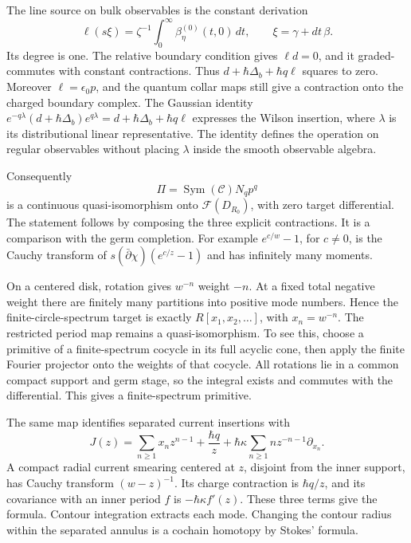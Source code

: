 The line source on bulk observables is the constant derivation
\[
 \ell(s\xi)=\zeta^{-1}\int_0^\infty\beta_\eta^{(0)}(t,0)\,dt,
 \qquad \xi=\gamma+dt\,\beta.
\]
Its degree is one. The relative boundary condition gives \(\ell d=0\),
and it graded-commutes with constant contractions. Thus
\(d+\hbar\Delta_b+\hbar q\ell\) squares to zero.
Moreover \(\ell=\epsilon_0p\), and the quantum collar maps still give a
contraction onto the charged boundary complex. The Gaussian identity
\(e^{-q\lambda}(d+\hbar\Delta_b)e^{q\lambda}
=d+\hbar\Delta_b+\hbar q\ell\) expresses the Wilson insertion, where
\(\lambda\) is its distributional linear representative. The identity
defines the operation on regular observables without placing \(\lambda\)
inside the smooth observable algebra.

Consequently
\begin{equation}\label{eq:vol2-native-smooth-period}
             \Pi=\operatorname{Sym}(\mathcal C)N_qp^q
\end{equation}
is a continuous quasi-isomorphism onto \(\mathscr F(D_{R_0})\), with zero
target differential. The statement follows by composing the three
explicit contractions. It is a comparison with the germ completion.
For example \(e^{c/w}-1\), for \(c\ne0\), is the Cauchy transform of
\(s(\bar\partial\chi)(e^{c/z}-1)\) and has infinitely many moments.

On a centered disk, rotation gives \(w^{-n}\) weight \(-n\).
At a fixed total negative weight there are finitely many partitions into
positive mode numbers. Hence the finite-circle-spectrum target is exactly
\(R[x_1,x_2,\ldots]\), with \(x_n=w^{-n}\).
The restricted period map remains a quasi-isomorphism. To see this, choose
a primitive of a finite-spectrum cocycle in its full acyclic cone, then
apply the finite Fourier projector onto the weights of that cocycle.
All rotations lie in a common compact support and germ stage, so the
integral exists and commutes with the differential. This gives a
finite-spectrum primitive.

The same map identifies separated current insertions with
\[
 J(z)=\sum_{n\geq1}x_nz^{n-1}+\frac{\hbar q}{z}
                  +\hbar\kappa\sum_{n\geq1}n z^{-n-1}\partial_{x_n}.
\]
A compact radial current smearing centered at \(z\), disjoint from the
inner support, has Cauchy transform \((w-z)^{-1}\). Its charge contraction
is \(\hbar q/z\), and its covariance with an inner period \(f\) is
\(-\hbar\kappa f'(z)\). These three terms give the formula.
Contour integration extracts each mode. Changing the contour radius within
the separated annulus is a cochain homotopy by Stokes' formula.

